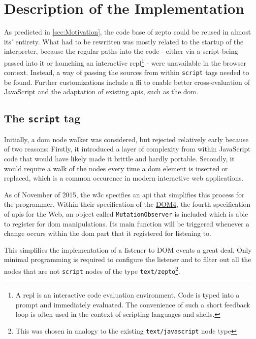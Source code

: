 \documentclass[oneside,11pt,xetex]{scrbook}
\begin{document}
\section{Description of the Implementation}

As predicted in \ref{sec:Motivation}, the code base of zepto could be reused in almost its' entirety.
What had to be rewritten was mostly related to the startup of the interpreter, because the regular
paths into the code - either via a script being passed into it or launching an interactive
\gls{repl}\footnote{A \gls{repl} is an interactive code evaluation environment. Code is typed into
a prompt and immediately evaluated. The convenience of such a short feedback loop is often used
in the context of scripting languages and shells.} - were unavailable in the browser context.
Instead, a way of passing the sources from within \texttt{script} tags needed to be found. Further
customizations include a \gls{ffi} to enable better cross-evaluation of JavaScript and the adaptation
of existing \gls{api}s, such as the \gls{dom}.

\subsection{The \texttt{script} tag}

Initially, a \gls{dom} node walker was considered, but rejected relatively early because of two reasons:
Firstly, it introduced a layer of complexity from within JavaScript code that would have likely made
it brittle and hardly portable. Secondly, it would require a walk of the nodes every time a \gls{dom}
element is inserted or replaced, which is a common occurence in modern interactive web applications.

As of November of 2015, the \gls{w3c} specifies an \gls{api} that simplifies this process for the programmer.
Within their specification of the \href{https://www.w3.org/TR/dom/#mutationobserver}{DOM4}, the fourth
specification of \gls{api}s for the Web, an object called \texttt{MutationObserver} is included which
is able to register for \gls{dom} manipulations. Its main function will be triggered whenever a change
occurs within the \gls{dom} part that it registered for listening to.

This simplifies the implementation of a listener to DOM events a great deal. Only minimal programming
is required to configure the listener and to filter out all the nodes that are not \texttt{script} nodes
of the type \texttt{text/zepto}\footnote{This was chosen in analogy to the existing \texttt{text/javascript}
node type}.
\end{document}
